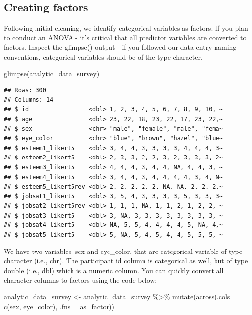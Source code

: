 \documentclass[
]{krantz}
\makeatletter
\newenvironment{Shaded}{\begin{snugshade}}{\end{snugshade}}
\newcommand{\AttributeTok}[1]{\textcolor[rgb]{0.61,0.61,0.61}{#1}}
\newcommand{\FunctionTok}[1]{\textcolor[rgb]{0,0,0}{#1}}
\newcommand{\NormalTok}[1]{#1}
\newcommand{\OtherTok}[1]{\textcolor[rgb]{0.37,0.37,0.37}{#1}}
\newcommand{\SpecialCharTok}[1]{\textcolor[rgb]{0,0,0}{#1}}
\newenvironment{kframe}{%
\medskip{}
\setlength{\fboxsep}{.8em}
 \def\at@end@of@kframe{}%
 \ifinner\ifhmode%
  \def\at@end@of@kframe{\end{minipage}}%
  \begin{minipage}{\columnwidth}%
 \fi\fi%
 \def\FrameCommand##1{\hskip\@totalleftmargin \hskip-\fboxsep
 \colorbox{shadecolor}{##1}\hskip-\fboxsep
     \hskip-\linewidth \hskip-\@totalleftmargin \hskip\columnwidth}%
 \MakeFramed {\advance\hsize-\width
   \@totalleftmargin\z@ \linewidth\hsize
   \@setminipage}}%
 {\par\unskip\endMakeFramed%
 \at@end@of@kframe}
\renewenvironment{Shaded}{\begin{kframe}}{\end{kframe}}
\makeatother
\begin{document}
\hypertarget{creating-factors}{%
\subsection{Creating factors}\label{creating-factors}}

Following initial cleaning, we identify categorical variables as factors. If you plan to conduct an ANOVA - it's critical that all predictor variables are converted to factors. Inspect the glimpse() output - if you followed our data entry naming conventions, categorical variables should be of the type character.

\begin{Shaded}
\begin{Highlighting}[]
\FunctionTok{glimpse}\NormalTok{(analytic\_data\_survey)}
\end{Highlighting}
\end{Shaded}

\begin{verbatim}
## Rows: 300
## Columns: 14
## $ id                 <dbl> 1, 2, 3, 4, 5, 6, 7, 8, 9, 10, ~
## $ age                <dbl> 23, 22, 18, 23, 22, 17, 23, 22,~
## $ sex                <chr> "male", "female", "male", "fema~
## $ eye_color          <chr> "blue", "brown", "hazel", "blue~
## $ esteem1_likert5    <dbl> 3, 4, 4, 3, 3, 3, 3, 4, 4, 4, 3~
## $ esteem2_likert5    <dbl> 2, 3, 3, 2, 2, 3, 2, 3, 3, 3, 2~
## $ esteem3_likert5    <dbl> 4, 4, 4, 3, 4, 4, NA, 4, 4, 3, ~
## $ esteem4_likert5    <dbl> 3, 4, 4, 3, 4, 4, 4, 4, 3, 4, N~
## $ esteem5_likert5rev <dbl> 2, 2, 2, 2, 2, NA, NA, 2, 2, 2,~
## $ jobsat1_likert5    <dbl> 3, 5, 4, 3, 3, 3, 3, 5, 3, 3, 3~
## $ jobsat2_likert5rev <dbl> 1, 1, 1, NA, 1, 1, 2, 1, 2, 2, ~
## $ jobsat3_likert5    <dbl> 3, NA, 3, 3, 3, 3, 3, 3, 3, 3, ~
## $ jobsat4_likert5    <dbl> NA, 5, 5, 4, 4, 4, 4, 5, NA, 4,~
## $ jobsat5_likert5    <dbl> 5, NA, 5, 4, 5, 4, 4, 5, 5, 5, ~
\end{verbatim}

We have two variables, sex and eye\_color, that are categorical variable of type character (i.e., chr). The participant id column is categorical as well, but of type double (i.e., dbl) which is a numeric column. You can quickly convert all character columns to factors using the code below:

\begin{Shaded}
\begin{Highlighting}[]
\NormalTok{analytic\_data\_survey }\OtherTok{\textless{}{-}}\NormalTok{ analytic\_data\_survey }\SpecialCharTok{\%\textgreater{}\%}
  \FunctionTok{mutate}\NormalTok{(}\FunctionTok{across}\NormalTok{(}\AttributeTok{.cols =} \FunctionTok{c}\NormalTok{(sex, eye\_color),}
                \AttributeTok{.fns =}\NormalTok{ as\_factor))}
\end{Highlighting}
\end{Shaded}
\end{document}
